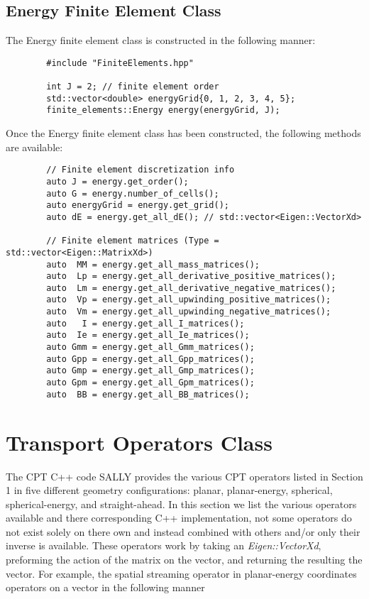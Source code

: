 \documentclass[../main.tex]{subfiles}
\begin{document}
    \subsection{Energy Finite Element Class}
    The Energy finite element class is constructed in the following manner:
    \begin{lstlisting}
        #include "FiniteElements.hpp"
        
        int J = 2; // finite element order
        std::vector<double> energyGrid{0, 1, 2, 3, 4, 5};
        finite_elements::Energy energy(energyGrid, J);
    \end{lstlisting}
    Once the Energy finite element class has been constructed, the following methods are available:
    \begin{lstlisting}
        // Finite element discretization info
        auto J = energy.get_order();
        auto G = energy.number_of_cells();
        auto energyGrid = energy.get_grid();
        auto dE = energy.get_all_dE(); // std::vector<Eigen::VectorXd>
        
        // Finite element matrices (Type = std::vector<Eigen::MatrixXd>)
        auto  MM = energy.get_all_mass_matrices();
        auto  Lp = energy.get_all_derivative_positive_matrices();
        auto  Lm = energy.get_all_derivative_negative_matrices();
        auto  Vp = energy.get_all_upwinding_positive_matrices();
        auto  Vm = energy.get_all_upwinding_negative_matrices();
        auto   I = energy.get_all_I_matrices();
        auto  Ie = energy.get_all_Ie_matrices();
        auto Gmm = energy.get_all_Gmm_matrices();
        auto Gpp = energy.get_all_Gpp_matrices();
        auto Gmp = energy.get_all_Gmp_matrices();
        auto Gpm = energy.get_all_Gpm_matrices();
        auto  BB = energy.get_all_BB_matrices();
    \end{lstlisting}

\section{Transport Operators Class}
The CPT C++ code SALLY provides the various CPT operators listed in Section 1 in five different geometry configurations: planar, planar-energy, spherical, spherical-energy, and straight-ahead. In this section we list the various operators available and there corresponding C++ implementation, not some operators do not exist solely on there own and instead combined with others and/or only their inverse is available. These operators work by taking an \emph{Eigen::VectorXd}, preforming the action of the matrix on the vector, and returning the resulting the vector. For example, the spatial streaming operator in planar-energy coordinates operators on a vector in the following manner
    
\end{document}
